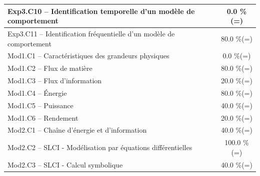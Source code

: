 \begin{center}
\begin{tabular}{|p{.7\linewidth}|c|}
Exp3.C10 -- Identification temporelle d’un modèle de comportement&0.0 \%(=)\\ \hline 
Exp3.C11 -- Identification fréquentielle d’un modèle de comportement&80.0 \%(=)\\ \hline 
Mod1.C1 -- Caractéristiques des grandeurs physiques&0.0 \%(=)\\ \hline 
Mod1.C2 -- Flux de matière&80.0 \%(=)\\ \hline 
Mod1.C3 -- Flux d’information&20.0 \%(=)\\ \hline 
Mod1.C4 -- Énergie&80.0 \%(=)\\ \hline 
Mod1.C5 -- Puissance&40.0 \%(=)\\ \hline 
Mod1.C6 -- Rendement&20.0 \%(=)\\ \hline 
Mod2.C1 -- Chaîne d’énergie et d'information&40.0 \%(=)\\ \hline 
Mod2.C2 -- SLCI - Modélisation par équations différentielles&100.0 \%(=)\\ \hline 
Mod2.C3 -- SLCI - Calcul symbolique&40.0 \%(=)\\ \hline 
\end{tabular} 
\end{center} 
\normalsize 
 
